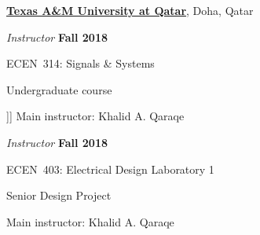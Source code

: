 \documentclass[10pt]{article}
\newcommand{\halfblankline}{\quad\vspace{-0.5\baselineskip}\pagebreak[3]}
\begin{document}
\href{http://www.qatar.tamu.edu/}{\textbf{Texas A\&M University at Qatar}},
Doha, Qatar
\begin{outerlist}
\item[] \textit{Instructor} \hfill \textbf{Fall 2018}
    \begin{innerlist}
        \item ECEN~314: Signals \& Systems
        \begin{innerlist}
            \item[] Undergraduate course
            \item]] Main instructor: Khalid A. Qaraqe
        \end{innerlist}
    \end{innerlist}

\item[] \textit{Instructor} \hfill \textbf{Fall 2018}
    \begin{innerlist}
        \item ECEN~403: Electrical Design Laboratory 1
        \begin{innerlist}
            \item[] Senior Design Project
            \item[] Main instructor: Khalid A. Qaraqe
        \end{innerlist}
    \end{innerlist}
\end{outerlist}

\halfblankline
\end{document}
